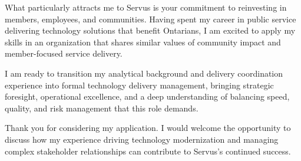 \documentclass[11pt, letterpaper]{awesome-cv}
\begin{document}
\begin{cvletter}
What particularly attracts me to Servus is your commitment to reinvesting in members, employees, and communities. Having spent my career in public service delivering technology solutions that benefit Ontarians, I am excited to apply my skills in an organization that shares similar values of community impact and member-focused service delivery.

I am ready to transition my analytical background and delivery coordination experience into formal technology delivery management, bringing strategic foresight, operational excellence, and a deep understanding of balancing speed, quality, and risk management that this role demands.

Thank you for considering my application. I would welcome the opportunity to discuss how my experience driving technology modernization and managing complex stakeholder relationships can contribute to Servus's continued success.
\end{cvletter}


\makeletterclosing%
\end{document}
